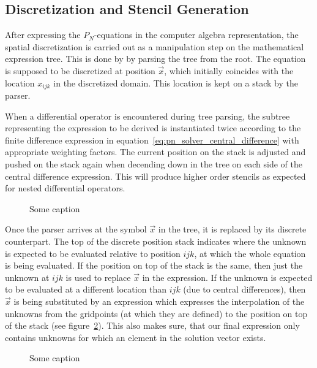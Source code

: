 \subsection{Discretization and Stencil Generation}
\label{sec:pn_stencil_gen}

After expressing the $P_N$-equations in the computer algebra representation, the spatial discretization is carried out as a manipulation step on the mathematical expression tree. This is done by by parsing the tree from the root. The equation is supposed to be discretized at position $\vec{x}$, which initially coincides with the location $x_{ijk}$ in the discretized domain. This location is kept on a stack by the parser.

When a differential operator is encountered during tree parsing, the subtree representing the expression to be derived is instantiated twice according to the finite difference expression in equation~\ref{eq:pn_solver_central_difference} with appropriate weighting factors. The current position on the stack is adjusted and pushed on the stack again when decending down in the tree on each side of the central difference expression. This will produce higher order stencils as expected for nested differential operators.
\begin{figure}[h]
\centering
{}
\caption{Some caption}
\label{fig:pn_discretization_differential}
\end{figure}

Once the parser arrives at the symbol $\vec{x}$ in the tree, it is replaced by its discrete counterpart. The top of the discrete position stack indicates where the unknown is expected to be evaluated relative to position $ijk$, at which the whole equation is being evaluated. If the position on top of the stack is the same, then just the unknown at $ijk$ is used to replace $\vec{x}$ in the expression. If the unknown is expected to be evaluated at a different location than $ijk$ (due to central differences), then $\vec{x}$ is being substituted by an expression which expresses the interpolation of the unknowns from the gridpoints (at which they are defined) to the position on top of the stack (see figure~\ref{fig:pn_discretization_interpolation}). This also makes sure, that our final expression only contains unknowns for which an element in the solution vector exists.
\begin{figure}[h]
\centering
{}
\caption{Some caption}
\label{fig:pn_discretization_interpolation}
\end{figure}

